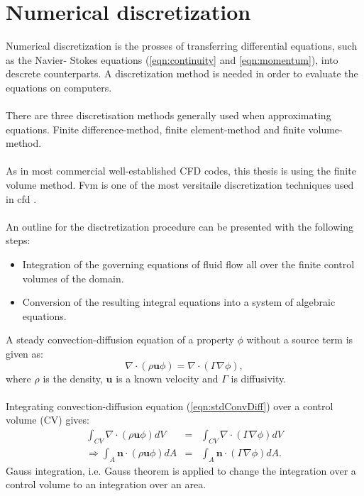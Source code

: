 \documentclass[a4paper, 12pt]{report}
\begin{document}
\section{Numerical discretization}
\label{sec:NumericalDiscretization}
Numerical discretization is the prosses of transferring differential equations, such as the Navier- Stokes equations (\ref{eqn:continuity} and \ref{eqn:momentum}), into descrete counterparts.
A discretization method is needed in order to evaluate the equations on computers. \\
\\
There are three discretisation methods generally used when approximating equations. Finite difference-method, finite element-method and finite volume-method.\\
\\
As in most commercial well-established CFD codes, this thesis is using the finite volume method. Fvm is one of the most versitaile discretization techniques used in cfd \cite{CFD}.\\
\\
An outline for the disctretization procedure can be presented with the following steps:
\begin{itemize}
\item Integration of the governing equations of fluid flow all over the finite control volumes of the domain.
\item Conversion of the resulting integral equations into a system of algebraic equations.
\end{itemize}
A steady convection-diffusion equation of a property $\phi$ without a source term is given as:
\begin{equation}
\nabla \cdot (\rho \mathbf{u} \phi) =  \nabla \cdot (\Gamma \nabla \phi),
\label{eqn:stdConvDiff}
\end{equation}
where $\rho$ is the density, $\mathbf{u}$ is a known velocity and $\Gamma$ is diffusivity.\\
\\
Integrating convection-diffusion equation (\ref{eqn:stdConvDiff}) over a control volume (CV) gives:
\begin{eqnarray}
\int_{CV} \nabla \cdot (\rho \mathbf{u} \phi) dV &=& \int_{CV} \nabla \cdot (\Gamma \nabla  \phi) dV \nonumber \\
\label{eqn:intStdConvDiff}
\Rightarrow \int_{A} \mathbf{n} \cdot (\rho \mathbf{u} \phi) dA &=& \int_{A} \mathbf{n} \cdot (\Gamma \nabla  \phi) dA.
\end{eqnarray}
Gauss integration, i.e. Gauss theorem \cite{CFD} is applied to change the integration over a control volume to an integration over an area.
\end{document}

